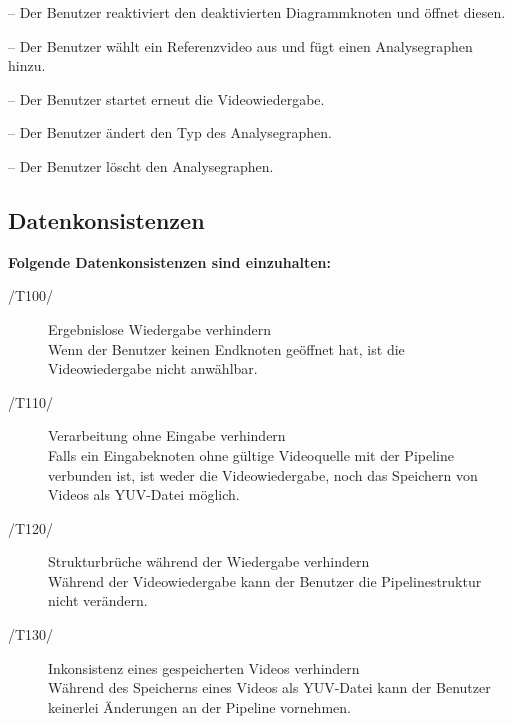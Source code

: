 \begin{description}
\begin{trivlist}
			\item[--] Der Benutzer reaktiviert den deaktivierten Diagrammknoten und öffnet diesen.
			\item[--] Der Benutzer wählt ein Referenzvideo aus und fügt einen Analysegraphen hinzu.
			\item[--] Der Benutzer startet erneut die Videowiedergabe.
			\item[--] Der Benutzer ändert den Typ des Analysegraphen.
			\item[--] Der Benutzer löscht den Analysegraphen.
		\end{trivlist}
\end{description}

\newpage

\subsection{Datenkonsistenzen}

\textbf{Folgende Datenkonsistenzen sind einzuhalten:}

\begin{description}
	\item[/T100/] Ergebnislose Wiedergabe verhindern ~\\
		Wenn der Benutzer keinen Endknoten geöffnet hat, ist die Videowiedergabe nicht anwählbar.
	\item[/T110/] Verarbeitung ohne Eingabe verhindern ~\\
		Falls ein Eingabeknoten ohne gültige Videoquelle mit der Pipeline verbunden ist, ist weder die Videowiedergabe, noch das Speichern von Videos als YUV-Datei möglich.
	\item[/T120/] Strukturbrüche während der Wiedergabe verhindern ~\\
		Während der Videowiedergabe kann der Benutzer die Pipelinestruktur nicht verändern.
	\item[/T130/] Inkonsistenz eines gespeicherten Videos verhindern ~\\
		Während des Speicherns eines Videos als YUV-Datei kann der Benutzer keinerlei Änderungen an der Pipeline vornehmen.
\end{description}

